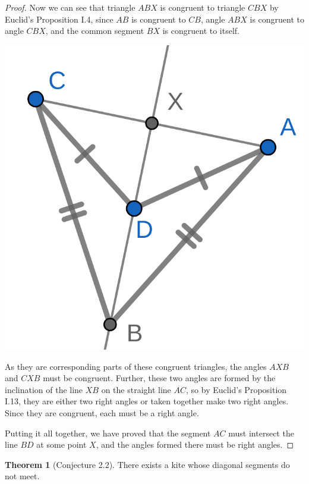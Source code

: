 \documentclass{tufte-handout}
\theoremstyle{definition}
\newtheorem{theorem}{Theorem}[section]
\begin{document}
\begin{proof}
Now we can see that triangle $ABX$ is congruent to triangle $CBX$ by Euclid's Proposition I.4, since $AB$ is congruent to $CB$, angle $ABX$ is congruent to angle $CBX$, and the common segment $BX$ is congruent to itself.

\begin{marginfigure}
  \includegraphics{images/kite_diags_meet_2.png}
\end{marginfigure}


As they are corresponding parts of these congruent triangles, the angles $AXB$ and $CXB$ must be congruent. Further, these two angles are formed by the inclination of the line $XB$ on the straight line $AC$, so by Euclid's Proposition I.13, they are either two right angles or taken together make two right angles. Since they are congruent, each must be a right angle.

Putting it all together, we have proved that the segment $AC$ must intersect the line $BD$ at some point $X$, and the angles formed there must be right angles.
\end{proof}

\clearpage

\begin{theorem}[Conjecture 2.2]\label{theorem:kites-6}
There exists a kite whose diagonal segments do not meet.
\end{theorem}
\end{document}
